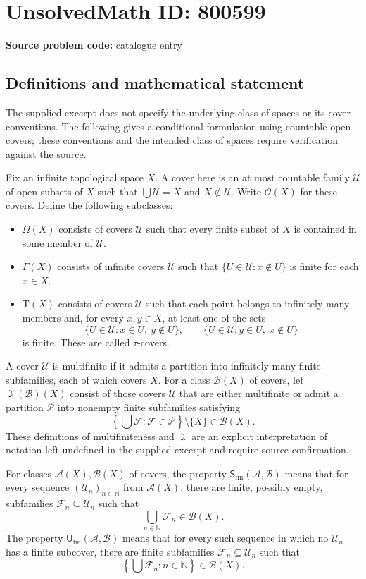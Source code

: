 \documentclass[11pt]{article}
\begin{document}
\section*{UnsolvedMath ID: 800599}
\textbf{Source problem code:} catalogue entry
\subsection{Definitions and mathematical statement}
The supplied excerpt does not specify the underlying class of spaces or its cover conventions. The following gives a conditional formulation using countable open covers; these conventions and the intended class of spaces require verification against the source.

Fix an infinite topological space \(X\). A cover here is an at most countable family \(\mathcal U\) of open subsets of \(X\) such that \(\bigcup\mathcal U=X\) and \(X\notin\mathcal U\). Write \(\mathcal O(X)\) for these covers. Define the following subclasses:
\begin{itemize}
\item \(\Omega(X)\) consists of covers \(\mathcal U\) such that every finite subset of \(X\) is contained in some member of \(\mathcal U\).
\item \(\Gamma(X)\) consists of infinite covers \(\mathcal U\) such that \(\{U\in\mathcal U:x\notin U\}\) is finite for each \(x\in X\).
\item \(\mathrm T(X)\) consists of covers \(\mathcal U\) such that each point belongs to infinitely many members and, for every \(x,y\in X\), at least one of the sets
\[
\{U\in\mathcal U:x\in U,\ y\notin U\},\qquad
\{U\in\mathcal U:y\in U,\ x\notin U\}
\]
is finite. These are called \(\tau\)-covers.
\end{itemize}
A cover \(\mathcal U\) is multifinite if it admits a partition into infinitely many finite subfamilies, each of which covers \(X\). For a class \(\mathcal B(X)\) of covers, let \(\gimel(\mathcal B)(X)\) consist of those covers \(\mathcal U\) that are either multifinite or admit a partition \(\mathcal P\) into nonempty finite subfamilies satisfying
\[
\left\{\bigcup\mathcal F:\mathcal F\in\mathcal P\right\}\setminus\{X\}\in\mathcal B(X).
\]
These definitions of multifiniteness and \(\gimel\) are an explicit interpretation of notation left undefined in the supplied excerpt and require source confirmation.

For classes \(\mathcal A(X),\mathcal B(X)\) of covers, the property \(\mathsf S_{\mathrm{fin}}(\mathcal A,\mathcal B)\) means that for every sequence \((\mathcal U_n)_{n\in\mathbb N}\) from \(\mathcal A(X)\), there are finite, possibly empty, subfamilies \(\mathcal F_n\subseteq\mathcal U_n\) such that
\[
\bigcup_{n\in\mathbb N}\mathcal F_n\in\mathcal B(X).
\]
The property \(\mathsf U_{\mathrm{fin}}(\mathcal A,\mathcal B)\) means that for every such sequence in which no \(\mathcal U_n\) has a finite subcover, there are finite subfamilies \(\mathcal F_n\subseteq\mathcal U_n\) such that
\[
\left\{\bigcup\mathcal F_n:n\in\mathbb N\right\}\in\mathcal B(X).
\]
\end{document}
